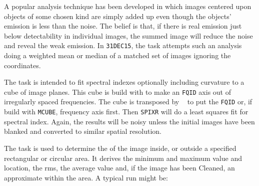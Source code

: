 A popular analysis technique has been developed in which images
centered upon objects of some chosen kind are simply added up even
though the objects' emission is less than the noise.  The belief is
that, if there is real emission just below detectability in individual
images, the summed image will reduce the noise and reveal the weak
emission.  In {\tt 31DEC15}, the task {\tt {}} attempts such
an analysis doing a weighted mean or median of a matched set of images
ignoring the coordinates.

The task {\tt {}} is intended to fit spectral indexes
optionally including curvature to a cube of image planes.  This cube
is build with {\tt {}} to make an {\tt FQID} axis out of
irregularly spaced frequencies.  The cube is transposed by {\tt
{}} to put the {\tt FQID} or, if build with {\tt MCUBE},
frequency axis first.  Then {\tt SPIXR} will do a least squares fit
for spectral index.  Again, the results will be noisy unless the
initial images have been blanked and converted to similar spatial
resolution.


     The task {\tt {}} is used to determine the
 of the image inside, or outside a specified
rectangular or circular area.  It derives the minimum and maximum
value and location, the rms, the average value and, if the image has
been Cleaned, an approximate  within the area.  A
typical run might be:

